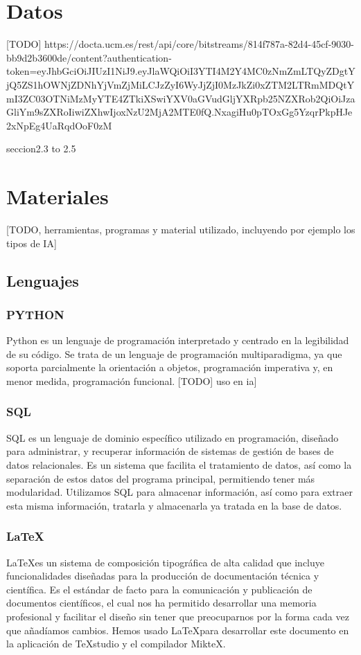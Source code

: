 \section{Datos} \label{sec:Materiales_datos}

[TODO]
https://docta.ucm.es/rest/api/core/bitstreams/814f787a-82d4-45cf-9030-bb9d2b3600de/content?authentication-token=eyJhbGciOiJIUzI1NiJ9.eyJlaWQiOiI3YTI4M2Y4MC0zNmZmLTQyZDgtYjQ5ZS1hOWNjZDNhYjVmZjMiLCJzZyI6WyJjZjI0MzJkZi0xZTM2LTRmMDQtYmI3ZC03OTNiMzMyYTE4ZTkiXSwiYXV0aGVudGljYXRpb25NZXRob2QiOiJzaGliYm9sZXRoIiwiZXhwIjoxNzU2MjA2MTE0fQ.NxagiHu0pTOxGg5YzqrPkpHJe2xNpEg4UaRqdOoF0zM

seccion2.3 to 2.5

\section{Materiales}

[TODO, herramientas, programas y material utilizado, incluyendo por ejemplo los tipos de IA]

\subsection{Lenguajes} 

\subsubsection*{PYTHON}
Python es un lenguaje de programación interpretado y centrado en la legibilidad de su código. Se trata de un lenguaje de programación multiparadigma, ya que soporta parcialmente la orientación a objetos, programación imperativa y, en menor medida, programación funcional. [TODO] uso en ia]

\subsubsection*{SQL}
SQL es un lenguaje de dominio específico utilizado en programación, diseñado para administrar, y recuperar información de sistemas de gestión de bases de datos relacionales. Es un sistema que facilita el tratamiento de datos, así como la separación de estos datos del programa principal, permitiendo tener más modularidad.
Utilizamos SQL para almacenar información, así como para extraer esta misma información, tratarla y almacenarla ya tratada en la base de datos. 

\subsubsection*{\LaTeX} \label{latexDef}
\LaTeX\space es un sistema de composición tipográfica de alta calidad que incluye funcionalidades diseñadas para la producción de documentación técnica y científica. Es el estándar de facto para la comunicación y publicación de documentos científicos, el cual nos ha permitido desarrollar una memoria profesional y facilitar el diseño sin tener que preocuparnos por la forma cada vez que añadíamos cambios.       
Hemos usado \LaTeX\space para desarrollar este documento en la aplicación de TeXstudio y el compilador MikteX.

